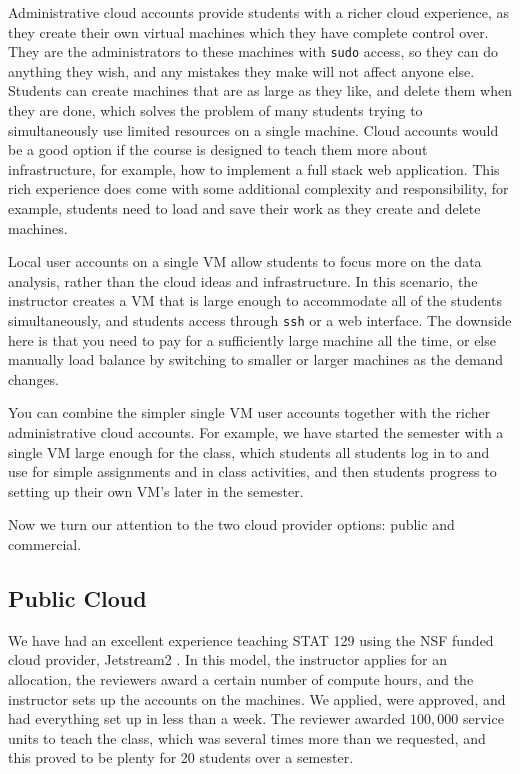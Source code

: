 \documentclass[12pt]{article}
\begin{document}
Administrative cloud accounts provide students with a richer cloud experience, as they create their own virtual machines which they have complete control over.
They are the administrators to these machines with \texttt{sudo} access, so they can do anything they wish, and any mistakes they make will not affect anyone else.
Students can create machines that are as large as they like, and delete them when they are done, which solves the problem of many students trying to simultaneously use limited resources on a single machine.
Cloud accounts would be a good option if the course is designed to teach them more about infrastructure, for example, how to implement a full stack web application.
This rich experience does come with some additional complexity and responsibility, for example, students need to load and save their work as they create and delete machines.

Local user accounts on a single VM allow students to focus more on the data analysis, rather than the cloud ideas and infrastructure.
In this scenario, the instructor creates a VM that is large enough to accommodate all of the students simultaneously, and students access through \texttt{ssh} or a web interface.
The downside here is that you need to pay for a sufficiently large machine all the time, or else manually load balance by switching to smaller or larger machines as the demand changes.

You can combine the simpler single VM user accounts together with the richer administrative cloud accounts.
For example, we have started the semester with a single VM large enough for the class, which students all students log in to and use for simple assignments and in class activities, and then students progress to setting up their own VM's later in the semester.

Now we turn our attention to the two cloud provider options: public and commercial.



\subsection{Public Cloud}

We have had an excellent experience teaching STAT 129 using the NSF funded cloud provider, Jetstream2 \cite{hancock2021jetstream2}.
In this model, the instructor applies for an allocation, the reviewers award a certain number of compute hours, and the instructor sets up the accounts on the machines.
We applied, were approved, and had everything set up in less than a week.
The reviewer awarded $100,000$ service units to teach the class, which was several times more than we requested, and this proved to be plenty for 20 students over a semester.
\end{document}
